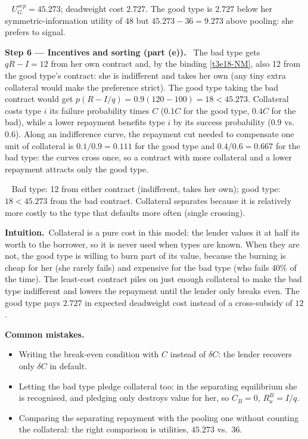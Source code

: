 \documentclass[11pt,a4paper]{article}
\newcommand{\step}[2]{\par\medskip\noindent\textbf{Step #1 --- #2.}~}
\newcommand{\intuition}{\par\medskip\noindent\textbf{Intuition.}~}
\newcommand{\answer}[1]{\par\smallskip\noindent\fbox{\textbf{Answer #1.}}~}
\newcommand{\pitfalls}{\par\medskip\noindent\textbf{Common mistakes.}}
\begin{document}
\answer{(d)} $U_G^{sep}=45.273$; deadweight cost $2.727$. The good type is $2.727$ below her symmetric-information utility of 48 but $45.273-36=9.273$ above pooling: she prefers to signal.

\step{6}{Incentives and sorting (part (e))} The bad type gets $qR-I=12$ from her own contract and, by the binding \eqref{t3e18-NM}, also 12 from the good type's contract: she is indifferent and takes her own (any tiny extra collateral would make the preference strict). The good type taking the bad contract would get $p(R-I/q)=0.9(120-100)=18<45.273$. Collateral costs type $i$ its failure probability times $C$ ($0.1C$ for the good type, $0.4C$ for the bad), while a lower repayment benefits type $i$ by its success probability ($0.9$ vs.\ $0.6$). Along an indifference curve, the repayment cut needed to compensate one unit of collateral is $0.1/0.9=0.111$ for the good type and $0.4/0.6=0.667$ for the bad type: the curves cross once, so a contract with more collateral and a lower repayment attracts only the good type.

\answer{(e)} Bad type: 12 from either contract (indifferent, takes her own); good type: $18<45.273$ from the bad contract. Collateral separates because it is relatively more costly to the type that defaults more often (single crossing).

\intuition Collateral is a pure cost in this model: the lender values it at half its worth to the borrower, so it is never used when types are known. When they are not, the good type is willing to burn part of its value, because the burning is cheap for her (she rarely fails) and expensive for the bad type (who fails 40\% of the time). The least-cost contract piles on just enough collateral to make the bad type indifferent and lowers the repayment until the lender only breaks even. The good type pays $2.727$ in expected deadweight cost instead of a cross-subsidy of $12$.

\pitfalls
\begin{itemize}
  \item Writing the break-even condition with $C$ instead of $\delta C$: the lender recovers only $\delta C$ in default.
  \item Letting the bad type pledge collateral too: in the separating equilibrium she is recognised, and pledging only destroys value for her, so $C_B=0$, $R_u^B=I/q$.
  \item Comparing the separating repayment with the pooling one without counting the collateral: the right comparison is utilities, $45.273$ vs.\ $36$.
\end{itemize}
\end{document}

